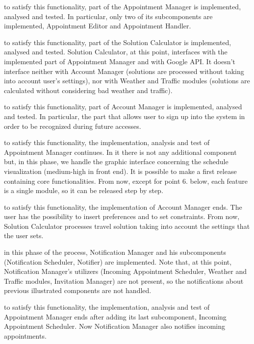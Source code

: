 \begin{description}[before={\renewcommand{\makelabel}[1]{ \textbf{\textit{##1}}:}}]
		
	\item[1. Appointment creation and management] to satisfy this functionality, part of the Appointment Manager is implemented, analysed and tested. In particular, only two of its subcomponents are implemented, Appointment Editor and Appointment Handler.
	\item[2. Solution calculation] to satisfy this functionality, part of the Solution Calculator is implemented, analysed and tested. Solution Calculator, at this point, interfaces with the implemented part of Appointment Manager and with Google API. It doesn't interface neither with Account Manager (solutions are processed without taking into account user's settings), nor with Weather and Traffic modules (solutions are calculated without considering bad weather and traffic).
	\item[3. Sign up] to satisfy this functionality, part of Account Manager is implemented, analysed and tested. In particular, the part that allows user to sign up into the system in order to be recognized during future accesses.
	\item[4. Schedule visualization] to satisfy this functionality, the implementation, analysis and test of Appointment Manager continues. In it there is not any additional component but, in this phase, we handle the graphic interface concerning the schedule visualization (medium-high in front end).\newline
	It is possible to make a first release containing core functionalities. From now, except for point 6. below, each feature is a single module, so it can be released step by step.
	\item[5. Settings] to satisfy this functionality, the implementation of Account Manager ends. The user has the possibility to insert preferences and to set constraints. From now, Solution Calculator processes travel solution taking into account the settings that the user sets.
	\item[6. Notification system] in this phase of the process, Notification Manager and his subcomponents (Notification Scheduler, Notifier) are implemented. Note that, at this point, Notification Manager's utilizers (Incoming Appointment Scheduler, Weather and Traffic modules, Invitation Manager) are not present, so the notifications about previous illustrated components are not handled.
	\item[7. Incoming Appointments] to satisfy this functionality, the implementation, analysis and test of Appointment Manager ends after adding its last subcomponent, Incoming Appointment Scheduler. Now Notification Manager also notifies incoming appointments.

\end{description}
